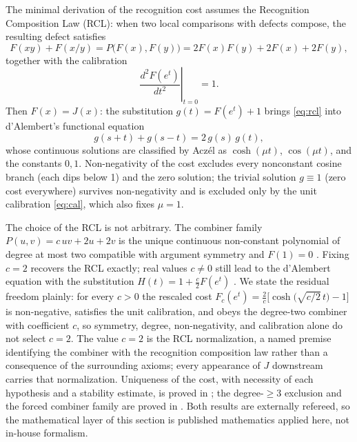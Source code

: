 \documentclass[11pt,letterpaper]{article}
\begin{document}
The minimal derivation of the recognition cost assumes the Recognition Composition Law (RCL): when two local comparisons with defects compose, the resulting defect satisfies
\begin{equation}
F(xy)+F(x/y)=P\bigl(F(x),F(y)\bigr)=2F(x)F(y)+2F(x)+2F(y),
\label{eq:rcl}
\end{equation}
together with the calibration
\begin{equation}
\left.\frac{d^{2}F(e^{t})}{dt^{2}}\right|_{t=0}=1.
\label{eq:cal}
\end{equation}
Then $F(x)=J(x)$: the substitution $g(t)=F(e^{t})+1$ brings \eqref{eq:rcl} into d'Alembert's functional equation
\begin{equation}
g(s+t)+g(s-t)=2\,g(s)\,g(t),
\label{eq:dalembert}
\end{equation}
whose continuous solutions are classified by Acz\'el \cite{Aczel} as $\cosh(\mu t)$, $\cos(\mu t)$, and the constants $0,1$. Non-negativity of the cost excludes every nonconstant cosine branch (each dips below 1) and the zero solution; the trivial solution $g\equiv 1$ (zero cost everywhere) survives non-negativity and is excluded only by the unit calibration \eqref{eq:cal}, which also fixes $\mu=1$.

The choice of the RCL is not arbitrary. The combiner family $P(u,v)=c\,uv+2u+2v$ is the unique continuous non-constant polynomial of degree at most two compatible with argument symmetry and $F(1)=0$ \cite{DAlembertInevitability}. Fixing $c=2$ recovers the RCL exactly; real values $c\neq 0$ still lead to the d'Alembert equation with the substitution $H(t)=1+\tfrac{c}{2}F(e^{t})$ \cite{DAlembertInevitability}. We state the residual freedom plainly: for every $c>0$ the rescaled cost $F_{c}(e^{t})=\tfrac{2}{c}\bigl[\cosh\bigl(\sqrt{c/2}\,t\bigr)-1\bigr]$ is non-negative, satisfies the unit calibration, and obeys the degree-two combiner with coefficient $c$, so symmetry, degree, non-negativity, and calibration alone do not select $c=2$. The value $c=2$ is the RCL normalization, a named premise identifying the combiner with the recognition composition law rather than a consequence of the surrounding axioms; every appearance of $J$ downstream carries that normalization. Uniqueness of the cost, with necessity of each hypothesis and a stability estimate, is proved in \cite{uniqueness}; the degree-$\ge 3$ exclusion and the forced combiner family are proved in \cite{DAlembertInevitability}. Both results are externally refereed, so the mathematical layer of this section is published mathematics applied here, not in-house formalism.
\end{document}
